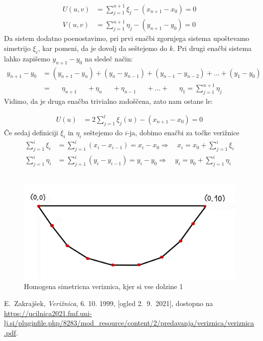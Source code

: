 \documentclass[a4paper,12pt]{article}
\begin{document}
\begin{align*}
    U(u,v) &= \sum_{j=1}^{n+1} \xi_j - (x_{n+1} - x_0) = 0 \\
    V(u,v) &= \sum_{j=1}^{n+1} \eta_j - (y_{n+1} - y_0) = 0
\end{align*}
Da sistem dodatno poenostavimo, pri prvi enačbi zgornjega sistema upoštevamo simetrijo $\xi_i$, kar pomeni, da je dovolj da seštejemo do $k$. Pri drugi enačbi
sistema lahko zapišemo $y_{n+1} - y_0$ na sledeč način:
\begin{align*}
    y_{n+1} - y_0 &= (y_{n+1} - y_{n}) + (y_{n} - y_{n-1}) + (y_{n-1} - y_{n-2}) + \dots + (y_{1} - y_{0}) \\
            &= \quad \> \> \eta_{n+1} \quad \> \> + \eta_{n} \quad \> \> + \eta_{n-1} \quad \> \> + \dots + \quad \> \>\eta_1 = \sum_{j=1}^{n+1} \eta_j
\end{align*}
Vidimo, da je druga enačba trivialno zadoščena, zato nam ostane le:

\begin{align}
    U(u) &= 2 \sum_{j=1}^{l} \xi_j(u) - (x_{n+1} - x_0) = 0 \label{en_U}
\end{align}
Če sedaj definiciji $\xi_i$ in $\eta_i$ seštejemo do $i$-ja, dobimo enačbi za 
točke verižnice
\begin{align}
    \sum_{j=1}^i \xi_i &= \sum_{j=1}^i (x_i - x_{i-1}) = x_i - x_0 \Rightarrow \quad x_i = x_0 + \sum_{j=1}^i \xi_i \\
    \sum_{j=1}^i \eta_i &= \sum_{j=1}^i (y_i - y_{i-1}) = y_i - y_0 \Rightarrow \quad y_i = y_0 + \sum_{j=1}^i \eta_i 
\end{align}
\\
\begin{figure}[h]
    \center
	\includegraphics[scale=0.1]{sim_ver}
	\caption{Homogena simetricna veriznica, kjer si vse dolzine 1}
\end{figure}

\begin{thebibliography}{99}

    E.~Zakrajšek, \emph{Verižnica}, 6. 10. 1999, [ogled 2.~9.~2021], dostopno na \url{https://ucilnica2021.fmf.uni-lj.si/pluginfile.php/8283/mod_resource/content/2/predavanja/veriznica/veriznica.pdf}.
\end{thebibliography}
\end{document}
